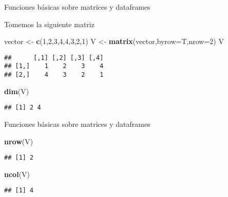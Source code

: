 \documentclass[ignorenonframetext,]{beamer}
\newenvironment{Shaded}{\begin{snugshade}}{\end{snugshade}}
\newcommand{\KeywordTok}[1]{\textcolor[rgb]{0.13,0.29,0.53}{\textbf{#1}}}
\newcommand{\DataTypeTok}[1]{\textcolor[rgb]{0.13,0.29,0.53}{#1}}
\newcommand{\DecValTok}[1]{\textcolor[rgb]{0.00,0.00,0.81}{#1}}
\newcommand{\StringTok}[1]{\textcolor[rgb]{0.31,0.60,0.02}{#1}}
\newcommand{\NormalTok}[1]{#1}
\begin{document}
\begin{frame}[fragile]{Funciones básicas sobre matrices y dataframes}

Tomemos la siguiente matriz

\begin{Shaded}
\begin{Highlighting}[]
\NormalTok{vector <-}\StringTok{ }\KeywordTok{c}\NormalTok{(}\DecValTok{1}\NormalTok{,}\DecValTok{2}\NormalTok{,}\DecValTok{3}\NormalTok{,}\DecValTok{4}\NormalTok{,}\DecValTok{4}\NormalTok{,}\DecValTok{3}\NormalTok{,}\DecValTok{2}\NormalTok{,}\DecValTok{1}\NormalTok{)}
\NormalTok{V <-}\StringTok{ }\KeywordTok{matrix}\NormalTok{(vector,}\DataTypeTok{byrow=}\NormalTok{T,}\DataTypeTok{nrow=}\DecValTok{2}\NormalTok{)}
\NormalTok{V}
\end{Highlighting}
\end{Shaded}

\begin{verbatim}
##      [,1] [,2] [,3] [,4]
## [1,]    1    2    3    4
## [2,]    4    3    2    1
\end{verbatim}

\begin{Shaded}
\begin{Highlighting}[]
\KeywordTok{dim}\NormalTok{(V)}
\end{Highlighting}
\end{Shaded}

\begin{verbatim}
## [1] 2 4
\end{verbatim}

\end{frame}

\begin{frame}[fragile]{Funciones básicas sobre matrices y dataframes}

\begin{Shaded}
\begin{Highlighting}[]
\KeywordTok{nrow}\NormalTok{(V)}
\end{Highlighting}
\end{Shaded}

\begin{verbatim}
## [1] 2
\end{verbatim}

\begin{Shaded}
\begin{Highlighting}[]
\KeywordTok{ncol}\NormalTok{(V)}
\end{Highlighting}
\end{Shaded}

\begin{verbatim}
## [1] 4
\end{verbatim}

\end{frame}
\end{document}
